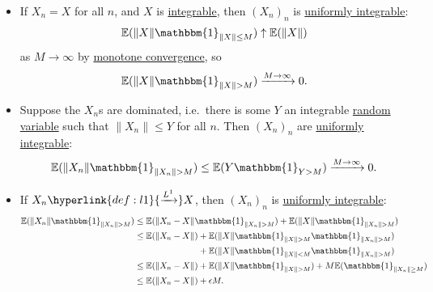 \documentclass{article}
\newcommand{\1}[1]{\mathbbm{1}_{#1}}
\newcommand{\Prob}{\mathbb{P}}
\newcommand{\E}{\mathbb{E}}
\begin{document}
\begin{remark}\leavevmode
    \begin{itemize}
        \item If $X_n = X$ for all $n$, and $X$ is \hyperlink{def:integral}{integrable}, then $(X_n)_n$ is \hyperlink{def:ui}{uniformly integrable}:
            \begin{equation*}
                \E(\|X\|\1{\|X\|\leq M}) \uparrow \E(\|X\|)
            \end{equation*}
            as $M \to \infty$ by \hyperlink{def:monConv}{monotone convergence}, so
            \begin{equation*}
                \E(\|X\| \1{\|X\|> M}) \xrightarrow{M \to \infty} 0.
            \end{equation*}

        \item Suppose the $X_n$s are dominated, i.e.\ there is some $Y$ an integrable \hyperlink{def:rv}{random variable} such that $\|X_n\|\leq Y$ for all $n$. Then $(X_n)_n$ are \hyperlink{def:ui}{uniformly integrable}:
            \begin{equation*}
                \E(\|X_n\| \1{\|X_n\| > M}) \leq \E(Y \1{Y>M}) \xrightarrow{M \to \infty} 0.
            \end{equation*}

        \item If $X_n \hyperlink{def:l1}{\xrightarrow{L^1}} X$, then $(X_n)_n$ is \hyperlink{def:ui}{uniformly integrable}:
            \begin{align*}
                    \E(\|X_n\|\1{\|X_n\|>M}) &\leq \E(\|X_n-X\| \1{\|X_n\|>M}) + \E(\|X\| \1{\|X_n\|>M})\\
                                             &\leq
                    \begin{aligned}[t]
                        \E(\|X_n-X\|) &+ \E(\|X\|\1{\|X\|>M} \1{\|X_n\|>M}) \\
                                      &+ \E(\|X\| \1{\|X\| < M} \1{\|X_n\|>M})
                    \end{aligned}
                    \\
                                             &\leq \E(\|X_n-X\|) + \E(\|X\| \1{\|X\|>M}) + M\E(\1{\|X_n\| \geq M}) \\
                                             &\leq \E(\|X_n-X\|) + \epsilon M.
            \end{align*}
    \end{itemize}
\end{remark}
\end{document}
